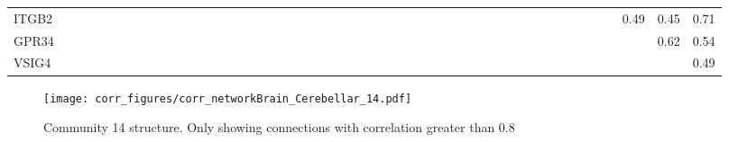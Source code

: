 \begin{longtable}{lrrrrrrrrrrrrrrrrrrrrrrrrrrrrrrrrrrrrrrrrrrrrrrr}
ITGB2    &            &            &            &              &            &              &              &            &              &             &            &             &            &            &            &               &                &                &                &               &               &            &             &              &              &           &             &               &             &             &              &            &               &               &              &             &             &          &              &            &               &             &              &             &        0.49 &        0.45 &        0.71 \\
GPR34    &            &            &            &              &            &              &              &            &              &             &            &             &            &            &            &               &                &                &                &               &               &            &             &              &              &           &             &               &             &             &              &            &               &               &              &             &             &          &              &            &               &             &              &             &             &        0.62 &        0.54 \\
VSIG4    &            &            &            &              &            &              &              &            &              &             &            &             &            &            &            &               &                &                &                &               &               &            &             &              &              &           &             &               &             &             &              &            &               &               &              &             &             &          &              &            &               &             &              &             &             &             &        0.49 \\
\end{longtable}


\begin{figure}[h!]
\centering
\texttt{[image: corr\_figures/corr\_networkBrain\_Cerebellar\_14.pdf]}
\caption{Community 14 structure. Only showing connections with correlation greater than 0.8}
\end{figure}




